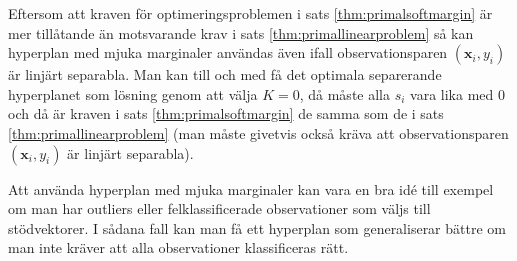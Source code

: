 \documentclass[a4paper, 12pt]{report}
\theoremstyle{definition}
\theoremstyle{remark}
\newtheorem*{rem}{Observation}
\newcommand{\bfx}{\mathbf{x}}
\begin{document}
Eftersom att kraven för optimeringsproblemen i sats \ref{thm:primalsoftmargin} är mer tillåtande än motsvarande krav i sats \ref{thm:primallinearproblem} så kan hyperplan med mjuka marginaler användas även ifall observationsparen $\left(\mathbf{x}_i, y_i\right)$ är linjärt separabla. Man kan till och med få det optimala separerande hyperplanet som lösning genom att välja $K=0$, då måste alla $s_i$ vara lika med 0 och då är kraven i sats \ref{thm:primalsoftmargin} de samma som de i sats \ref{thm:primallinearproblem} (man måste givetvis också kräva att observationsparen $\left(\bfx_i, y_i\right)$ är linjärt separabla).

Att använda hyperplan med mjuka marginaler kan vara en bra idé till exempel om man har outliers eller felklassificerade observationer som väljs till stödvektorer. I sådana fall kan man få ett hyperplan som generaliserar bättre om man inte kräver att alla observationer klassificeras rätt.


\end{document}
